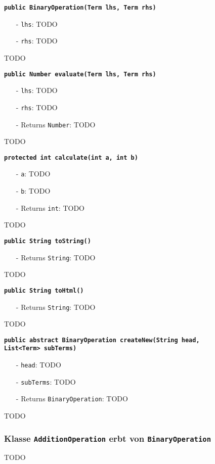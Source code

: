 \documentclass[parskip=full,11pt,twoside]{scrartcl}
\begin{document}
\textbf{\texttt{public BinaryOperation(Term lhs, Term rhs)}}
\begin{itemize}[noitemsep]
	\item[-] \texttt{lhs}: TODO
	\item[-] \texttt{rhs}: TODO
\end{itemize}
TODO

\textbf{\texttt{public Number evaluate(Term lhs, Term rhs)}}
\begin{itemize}[noitemsep]
	\item[-] \texttt{lhs}: TODO
	\item[-] \texttt{rhs}: TODO
	\item[-] Returns \texttt{Number}: TODO
\end{itemize}
TODO

\textbf{\texttt{protected int calculate(int a, int b)}}
\begin{itemize}[noitemsep]
	\item[-] \texttt{a}: TODO
	\item[-] \texttt{b}: TODO
	\item[-] Returns \texttt{int}: TODO
\end{itemize}
TODO

\textbf{\texttt{public String toString()}}
\begin{itemize}[noitemsep]
	\item[-] Returns \texttt{String}: TODO
\end{itemize}
TODO

\textbf{\texttt{public String toHtml()}}
\begin{itemize}[noitemsep]
	\item[-] Returns \texttt{String}: TODO
\end{itemize}
TODO

\textbf{\texttt{public abstract BinaryOperation createNew(String head,\\List<Term> subTerms)}}
\begin{itemize}[noitemsep]
	\item[-] \texttt{head}: TODO
	\item[-] \texttt{subTerms}: TODO
	\item[-] Returns \texttt{BinaryOperation}: TODO
\end{itemize}
TODO

\subsubsection{Klasse \texttt{AdditionOperation} erbt von \texttt{BinaryOperation}}
TODO
\end{document}
